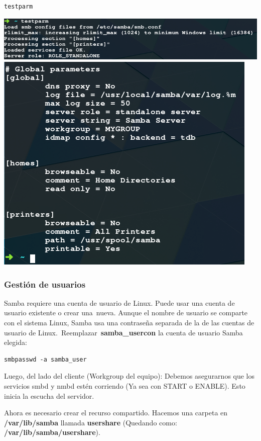 \documentclass[12pt]{extarticle}
\makeatletter
\def\maxwidth{\ifdim\Gin@nat@width>\linewidth\linewidth
    \else\Gin@nat@width\fi}
\let\Oldincludegraphics\includegraphics
\renewcommand{\includegraphics}[1]{\Oldincludegraphics[width=.8\maxwidth]{#1}}
\makeatother
\begin{document}
\begin{verbatim}
testparm
\end{verbatim}

\includegraphics{images/testparm1.png}
\includegraphics{images/testparm2.png}

\subsubsection{Gestión de usuarios}\label{gestiuxf3n-de-usuarios}

Samba requiere una cuenta de usuario de Linux. Puede usar una cuenta de
usuario existente o crear una~nueva. Aunque el nombre de usuario se
comparte con el sistema Linux, Samba usa una contraseña separada de la
de las cuentas de usuario de Linux.~Reemplazar~\textbf{samba\_usercon}
la cuenta de usuario Samba elegida:

\begin{verbatim}
smbpasswd -a samba_user
\end{verbatim}

Luego, del lado del cliente (Workgroup del equipo): Debemos asegurarnos
que los servicios smbd y nmbd estén corriendo (Ya sea con START o
ENABLE). Esto inicia la escucha del servidor.

Ahora es necesario crear el recurso compartido. Hacemos una carpeta en
\textbf{/var/lib/samba} llamada \textbf{usershare} (Quedando como:
\textbf{/var/lib/samba/usershare}).
\end{document}
